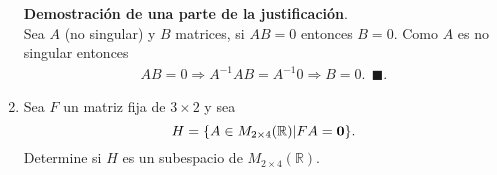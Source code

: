 \documentclass[11pt,letterpaper]{article}
\newcommand{\finf}{\blacksquare.}
\begin{document}
\begin{enumerate}
\textbf{Demostración de una parte de la justificación}. \\
Sea $A$ (no singular) y $B$ matrices, si $AB=0$ entonces $B=0$. Como $A$ es no singular entonces 
\begin{align*}
AB=0\Rightarrow A^{-1}AB=A^{-1}0\Rightarrow B=0.\ \ \finf
\end{align*}
\item Sea $F$ un matriz fija de $3\times 2$ y sea $$H=\{A\in M_{2\times 4}(\mathbb{R})|FA=\bf0\}.$$
Determine si $H$ es un subespacio de $M_{2\times 4}(\mathbb{R})$.


\end{enumerate}
\end{document}
